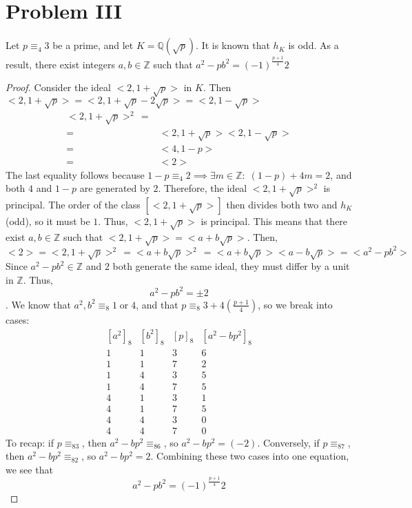 \documentclass{article}
\newcommand{\Q}{\mathbb{Q}}
\newcommand{\Z}{\mathbb{Z}}
\begin{document}
\section*{Problem III}
	Let $p\equiv_4 3$ be a prime, and let $K=\Q(\sqrt{p})$.  It is known that $h_K$ is odd.  As a result, there exist integers $a,b\in\Z$ such that $a^2-pb^2=(-1)^{\frac{p+1}{4}}2$
\begin{proof}
	Consider the ideal $<2,1+\sqrt{p}>$ in $K$.  Then $<2,1+\sqrt{p}>=<2,1+\sqrt{p}-2\sqrt{p}>=<2,1-\sqrt{p}>$
	\begin{align*}
	<2,1+\sqrt{p}>^2\,=&\\
	=&<2,1+\sqrt{p}><2,1-\sqrt{p}>\\
	=&<4,1-p>\\
	=&<2>
	\end{align*}The last equality follows because $1-p\equiv_4 2\implies \exists m\in\Z:\;(1-p)+4m=2$, and both $4$ and $1-p$ are generated by $2$.  Therefore, the ideal $<2,1+\sqrt{p}>^2$ is principal.  The order of the class $[<2,1+\sqrt{p}>]$ then divides both two and $h_K$(odd), so it must be $1$.  Thus, $<2,1+\sqrt{p}>$ is principal.  This means that there exist $a,b\in\Z$ such that $<2,1+\sqrt{p}>=<a+b\sqrt{p}>$.  Then,
	$$<2>=<2,1+\sqrt{p}>^2\,=<a+b\sqrt{p}>^2\,=<a+b\sqrt{p}><a-b\sqrt{p}>=<a^2-pb^2>$$
	Since $a^2-pb^2\in\Z$ and $2$ both generate the same ideal, they must differ by a unit in $\Z$.  Thus, $$a^2-pb^2=\pm{2}$$.  We know that $a^2,b^2\equiv_8 1\;\text{or}\;4$, and that $p\equiv_8 3+ 4(\frac{p+1}{4})$, so we break into cases:
	\[
	\begin{array}{cccc}
		[a^2]_8&[b^2]_8&[p]_8&[a^2-bp^2]_8\\
		1&1&3&6\\
		1&1&7&2\\
		1&4&3&5\\
		1&4&7&5\\
		4&1&3&1\\
		4&1&7&5\\
		4&4&3&0\\
		4&4&7&0
	\end{array}
	\]To recap: if $p\equiv_83$, then $a^2-bp^2\equiv_86$, so $a^2-bp^2=(-2)$.  Conversely, if $p\equiv_87$, then $a^2-bp^2\equiv_82$, so $a^2-bp^2=2$.  Combining these two cases into one equation, we see that $$a^2-pb^2=(-1)^\frac{p+1}{4}2$$
\end{proof}
\end{document}

